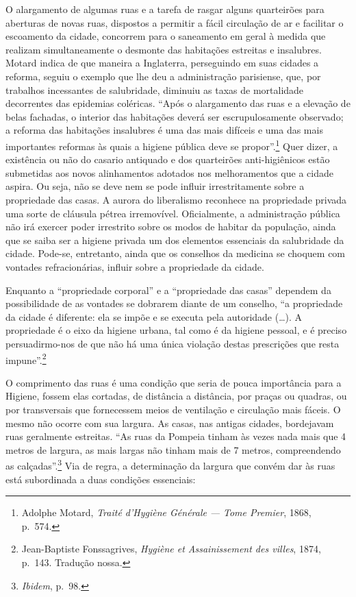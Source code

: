 O alargamento de algumas ruas e a tarefa de rasgar alguns quarteirões
para aberturas de novas ruas, dispostos a permitir a fácil circulação de
ar e facilitar o escoamento da cidade, concorrem para o saneamento em
geral à medida que realizam simultaneamente o desmonte das habitações
estreitas e insalubres. Motard indica de que maneira a Inglaterra,
perseguindo em suas cidades a reforma, seguiu o exemplo que lhe deu a
administração parisiense, que, por trabalhos incessantes de salubridade,
diminuiu as taxas de mortalidade decorrentes das epidemias coléricas.
``Após o alargamento das ruas e a elevação de belas fachadas, o interior
das habitações deverá ser escrupulosamente observado; a reforma das
habitações insalubres é uma das mais difíceis e uma das mais importantes
reformas às quais a higiene pública deve se propor''.\footnote{Adolphe
  Motard, \textit{Traité d'Hygiène Générale} \textit{--- Tome Premier}, 1868,
  p.~574.} Quer dizer, a existência ou não do casario antiquado e dos
quarteirões anti-higiênicos estão submetidas aos novos alinhamentos
adotados nos melhoramentos que a cidade aspira. Ou seja, não se deve nem
se pode influir irrestritamente sobre a propriedade das casas. A aurora
do liberalismo reconhece na propriedade privada uma sorte de cláusula
pétrea irremovível. Oficialmente, a administração pública não irá
exercer poder irrestrito sobre os modos de habitar da população, ainda
que se saiba ser a higiene privada um dos elementos essenciais da
salubridade da cidade. Pode-se, entretanto, ainda que os conselhos da
medicina se choquem com vontades refracionárias, influir sobre a
propriedade da cidade.

Enquanto a ``propriedade corporal'' e a ``propriedade das casas''
dependem da possibilidade de as vontades se dobrarem diante de um
conselho, ``a propriedade da cidade é diferente: ela se impõe e se
executa pela autoridade (\dots{}). A propriedade é o eixo da higiene urbana,
tal como é da higiene pessoal, e é preciso persuadirmo-nos de que não há
uma única violação destas prescrições que resta impune''.\footnote{Jean-Baptiste
  Fonssagrives, \textit{Hygiène et Assainissement des villes}, 1874,
  p.~143. Tradução nossa.}

O comprimento das ruas é uma condição que seria de pouca importância
para a Higiene, fossem elas cortadas, de distância a distância, por
praças ou quadras, ou por transversais que fornecessem meios de
ventilação e circulação mais fáceis. O mesmo não ocorre com sua largura.
As casas, nas antigas cidades, bordejavam ruas geralmente estreitas.
``As ruas da Pompeia tinham às vezes nada mais que 4 metros de largura,
as mais largas não tinham mais de 7 metros, compreendendo as
calçadas''.\footnote{\textit{Ibidem}, p.~98.} Via de regra, a determinação
da largura que convém dar às ruas está subordinada a duas condições
essenciais:

